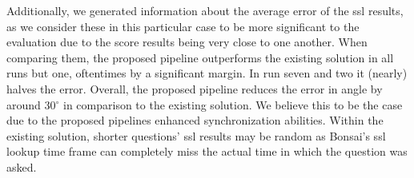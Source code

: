 Additionally, we generated information about the average error of the \gls{ssl} results, as we consider these in this particular case to be more significant to the evaluation due to the score results being very close to one another.
When comparing them, the proposed pipeline outperforms the existing solution in all runs but one, oftentimes by a significant margin.
In run seven and two it (nearly) halves the error.
Overall, the proposed pipeline reduces the error in angle by around 30$^\circ$ in comparison to the existing solution.
We believe this to be the case due to the proposed pipelines enhanced synchronization abilities.
Within the existing solution, shorter questions' \gls{ssl} results may be random as Bonsai's \gls{ssl} lookup time frame can completely miss the actual time in which the question was asked.














